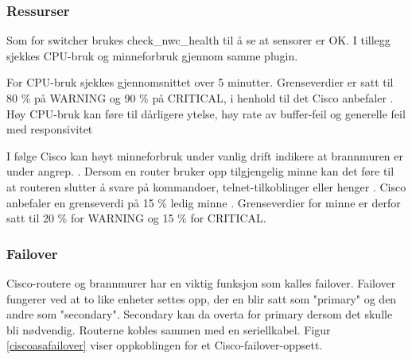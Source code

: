 \subsubsection{Ressurser}
Som for switcher brukes check\_nwc\_health til å se at sensorer er OK. I tillegg sjekkes CPU-bruk og minneforbruk gjennom samme plugin. 

For CPU-bruk sjekkes gjennomsnittet over 5 minutter. Grenseverdier er satt til 80 \% på WARNING og 90 \% på CRITICAL, i henhold til det Cisco anbefaler \cite{ciscounifiedcommunication}. Høy CPU-bruk kan føre til dårligere ytelse, høy rate av buffer-feil og generelle feil med responsivitet \cite{ciscocpurouters}

I følge Cisco kan høyt minneforbruk under vanlig drift indikere at brannmuren er under angrep. \cite{ciscomem}. Dersom en router bruker opp tilgjengelig minne kan det føre til at routeren slutter å svare på kommandoer, telnet-tilkoblinger eller henger \cite{ciscomemproblem} . Cisco anbefaler en grenseverdi på 15 \% ledig minne \cite{ciscounifiedcommunication}. Grenseverdier for minne er derfor satt til 20 \% for WARNING og 15 \% for CRITICAL.

\subsubsection{Failover}
Cisco-routere og brannmurer har en viktig funksjon som kalles failover. Failover fungerer ved at to like enheter settes opp, der en blir satt som "primary" og den andre som "secondary". Secondary kan da overta for primary dersom det skulle bli nødvendig. Routerne kobles sammen med en seriellkabel. Figur \ref{ciscoasafailover} viser oppkoblingen for et Cisco-failover-oppsett. 

